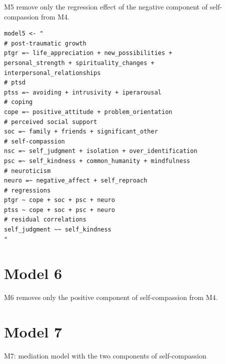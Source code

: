 \documentclass[
  english,
  man,floatsintext]{apa7}
\begin{document}
\begin{appendix}
M5 remove only the regression effect of the negative component of
self-compassion from M4.

\begin{verbatim}
model5 <- "
# post-traumatic growth
ptgr =~ life_appreciation + new_possibilities + 
personal_strength + spirituality_changes + 
interpersonal_relationships
# ptsd
ptss =~ avoiding + intrusivity + iperarousal
# coping
cope =~ positive_attitude + problem_orientation 
# perceived social support
soc =~ family + friends + significant_other
# self-compassion
nsc =~ self_judgment + isolation + over_identification
psc =~ self_kindness + common_humanity + mindfulness
# neuroticism
neuro =~ negative_affect + self_reproach
# regressions
ptgr ~ cope + soc + psc + neuro
ptss ~ cope + soc + psc + neuro
# residual correlations
self_judgment ~~ self_kindness
"
\end{verbatim}

\newpage

\hypertarget{model-6}{%
\section{Model 6}\label{model-6}}

M6 removes only the positive component of self-compassion from M4.

\newpage

\hypertarget{model-7}{%
\section{Model 7}\label{model-7}}

M7: mediation model with the two components of self-compassion


\end{appendix}
\end{document}

